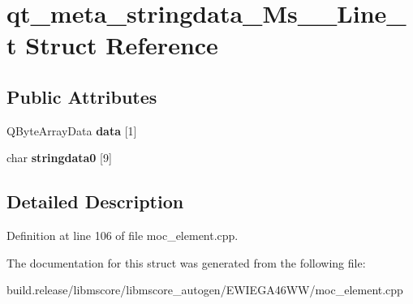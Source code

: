 \hypertarget{structqt__meta__stringdata___ms_____line__t}{}\section{qt\+\_\+meta\+\_\+stringdata\+\_\+\+Ms\+\_\+\+\_\+\+Line\+\_\+t Struct Reference}
\label{structqt__meta__stringdata___ms_____line__t}
\subsection*{Public Attributes}
\begin{DoxyCompactItemize}
\item 
\mbox{\label{structqt__meta__stringdata___ms_____line__t_a3ea55b923ad517f00d1b82fd938be257}} 
Q\+Byte\+Array\+Data {\bfseries data} \mbox{[}1\mbox{]}
\item 
\mbox{\label{structqt__meta__stringdata___ms_____line__t_a48e2e8be7ea749b8da9482398e1621c5}} 
char {\bfseries stringdata0} \mbox{[}9\mbox{]}
\end{DoxyCompactItemize}


\subsection{Detailed Description}


Definition at line 106 of file moc\+\_\+element.\+cpp.



The documentation for this struct was generated from the following file\+:\begin{DoxyCompactItemize}
\item 
build.\+release/libmscore/libmscore\+\_\+autogen/\+E\+W\+I\+E\+G\+A46\+W\+W/moc\+\_\+element.\+cpp\end{DoxyCompactItemize}
